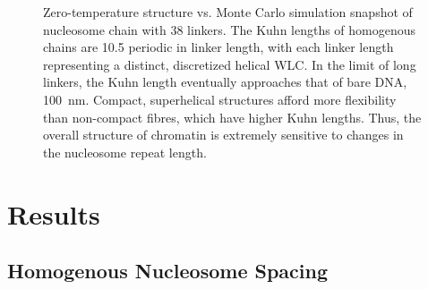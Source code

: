 \documentclass[%
 reprint,
superscriptaddress,
showpacs,preprintnumbers,
 amsmath,amssymb,
 aps,
 prl,
]{revtex4-1}
\begin{document}
\begin{figure}[th]
    \begin{centering}
    \end{centering}
    \caption{\protect{} Zero-temperature structure vs. Monte Carlo simulation
    snapshot of nucleosome chain with \SI{38}{\basepair} linkers.
    \protect{} The Kuhn lengths of homogenous chains are
    \SI{10.5}{\basepair} periodic in linker length, with each linker length
    representing a distinct, discretized helical WLC\@. In the limit of long
    linkers, the Kuhn length eventually approaches that of bare DNA,
    \SI{100}{\nano\metre}. \protect{} Compact, superhelical
    structures afford more flexibility than non-compact fibres, which have
    higher Kuhn lengths. Thus, the overall structure of chromatin is extremely
    sensitive to changes in the nucleosome repeat length.}\label{fig:homo-kuhn}
\end{figure}

\section{\label{sec:model}Results}
\subsection{\label{sec:homo-kuhn}Homogenous Nucleosome Spacing}
\end{document}
